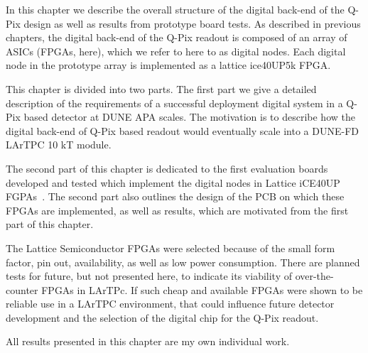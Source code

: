 In this chapter we describe the overall structure of the digital back-end of the Q-Pix design as well as results from prototype board tests.
As described in previous chapters, the digital back-end of the Q-Pix readout is composed of an array of ASICs (FPGAs, here), which we refer to here to as digital nodes.
Each digital node in the prototype array is implemented as a lattice ice40UP5k FPGA.

This chapter is divided into two parts.
The first part we give a detailed description of the requirements of a successful deployment digital system in a Q-Pix based detector at DUNE APA scales.
The motivation is to describe how the digital back-end of Q-Pix based readout would eventually scale into a DUNE-FD LArTPC 10 kT module.

The second part of this chapter is dedicated to the first evaluation boards developed and tested which implement the digital nodes in Lattice iCE40UP FGPAs~\citep{lattice_ice40up_datasheet}.
The second part also outlines the design of the PCB on which these FPGAs are implemented, as well as results, which are motivated from the first part of this chapter.

The Lattice Semiconductor FPGAs \citep{lattice_ice40up_datasheet} were selected because of the small form factor, pin out, availability, as well as low power consumption.
There are planned tests for future, but not presented here, to indicate its viability of over-the-counter FPGAs in LArTPc.
If such cheap and available FPGAs were shown to be reliable use in a LArTPC environment, that could influence future detector development and the selection of the digital chip for the Q-Pix readout.

All results presented in this chapter are my own individual work.



